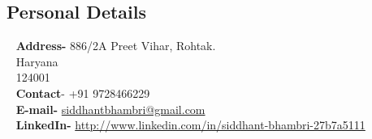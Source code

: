 \documentclass[11pt]{article}
\begin{document}
\begin{minipage}{1.00\linewidth}
\begin{flushleft}
	\section{\color{green}Per\color{purple}s\color{black}onal D\color{purple}e\color{black}tai\color{purple}l\color{black}s}
	~
\textbf{Address-}    
    886/2A 
    Preet Vihar, Rohtak.\\
    ~
    Haryana\\
    ~
    124001\\
    ~
    \textbf{Contact}-
    +91 9728466229\\
~
\textbf{E-mail-} \href{mailto:siddhantbhambri@gmail.com}{siddhantbhambri@gmail.com}\\
 ~   
    \textbf{LinkedIn-}
    \href{http://www.linkedin.com/in/siddhant-bhambri-27b7a5111}{http://www.linkedin.com/in/siddhant-bhambri-27b7a5111}
\end{flushleft}


\end{minipage}
\end{document}
